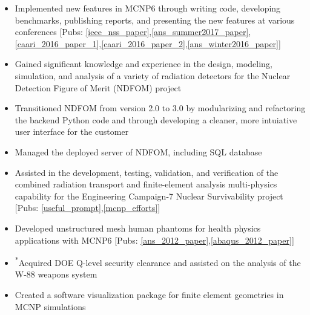 \begin{center}
	\begin{minipage}{\textwidth}
	\begin{itemize}
	    \item Implemented new features in \textsc{MCNP6} through writing code, developing benchmarks, publishing reports, 
		    and presenting the new features at various conferences [Pubs: \ref{ieee_nss_paper},\ref{ans_summer2017_paper},\ref{caari_2016_paper_1},\ref{caari_2016_paper_2},\ref{ans_winter2016_paper}] 
		\item Gained significant knowledge and experience in the design, modeling, simulation, and analysis 
		    of a variety of radiation detectors for the Nuclear Detection Figure of Merit (NDFOM) project
	    \item Transitioned NDFOM from version 2.0 to 3.0 by modularizing and refactoring the backend 
		   Python code and through developing a cleaner, more intuiative user interface for the customer
	    \item Managed the deployed server of NDFOM, including SQL database
	    \item Assisted in the development, testing, validation, and verification of the combined radiation transport and 
		    finite-element analysis multi-physics capability for the Engineering Campaign-7 Nuclear Survivability project [Pubs: \ref{useful_prompt},\ref{mcnp_efforts}]
	    \item Developed unstructured mesh human phantoms for health physics applications with \textsc{MCNP6} [Pubs: \ref{ans_2012_paper},\ref{abaqus_2012_paper}]
	    \item \textsuperscript{*}Acquired DOE Q-level security clearance and assisted on the analysis of the W-88 weapons system
	    \item Created a software visualization package for finite element geometries in MCNP simulations

\end{itemize}
\end{minipage}
\end{center}
